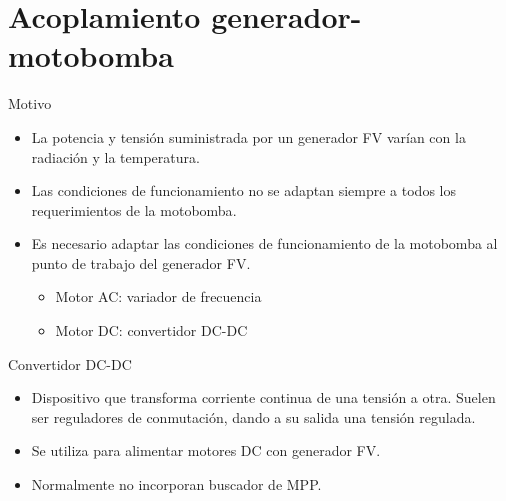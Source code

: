 \documentclass[xcolor={usenames,svgnames,dvipsnames}]{beamer}
\begin{document}
\section{Acoplamiento generador-motobomba}
\label{sec-3}

\begin{frame}[label=sec-3-0-1]{Motivo}
\begin{itemize}
\item La \alert{potencia y tensión suministrada por un generador FV varían} con la radiación y la temperatura.

\item Las condiciones de funcionamiento \alert{no se adaptan siempre a todos los requerimientos de la motobomba}.

\item Es necesario adaptar las condiciones de funcionamiento de la motobomba al punto de trabajo del generador FV.

\begin{itemize}
\item \alert{Motor AC: variador de frecuencia}

\item \alert{Motor DC: convertidor DC-DC}
\end{itemize}
\end{itemize}
\end{frame}

\begin{frame}[label=sec-3-0-2]{Convertidor DC-DC}
\begin{itemize}
\item Dispositivo que \alert{transforma corriente continua de una tensión a otra}. Suelen ser reguladores de conmutación, dando a su salida una tensión regulada.

\item Se utiliza para alimentar \alert{motores DC con generador FV}.

\item Normalmente no incorporan buscador de MPP.
\end{itemize}
\end{frame}
\end{document}
